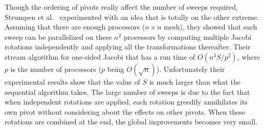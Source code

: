 \documentclass[10pt, conference, compsocconf]{IEEEtran}
\begin{document}

Though the ordering of pivots really affect the number of sweeps required, Strumpen et al.~\cite{strumpen2003stream} experimented with an idea that is totally on the other extreme. Assuming that there are enough processors ($n \times n$ mesh), they showed that each sweep can be parallelized on these $n^2$ processors by computing multiple Jacobi rotations independently and applying all the transformations thereafter. Their stream algorithm for one-sided Jacobi that has a run time of $O(n^3S/p^2)$, where $p$ is the number of processors ($p$ being $O(\sqrt{n})$). Unfortunately their experimental results show that the value of $S$ is much larger than what the sequential algorithm takes. The large number of sweeps is due to the fact that when independent rotations are applied, each rotation greedily annihilates its own pivot without considering about the effects on other pivots. When these rotations are combined at the end, the global improvements becomes very small.
\end{document}
